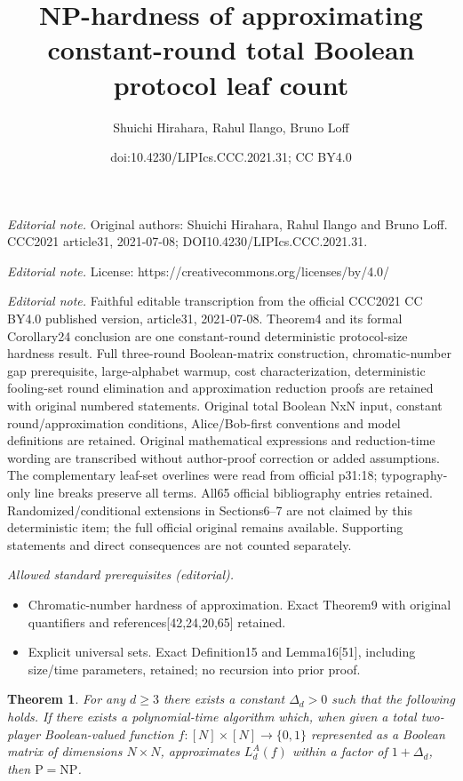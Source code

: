 \documentclass[10pt,a4paper]{article}
\title{NP-hardness of approximating constant-round total Boolean protocol leaf count}
\author{Shuichi Hirahara, Rahul Ilango, Bruno Loff}
\date{doi:10.4230/LIPIcs.CCC.2021.31; CC BY4.0}
\newtheorem{theorem}{Theorem}
\begin{document}
\maketitle
\noindent\textit{Editorial note.} Original authors: Shuichi Hirahara, Rahul Ilango and Bruno Loff. CCC2021 article31, 2021-07-08; DOI10.4230/LIPIcs.CCC.2021.31.\par\medskip
\noindent\textit{Editorial note.} License: https://creativecommons.org/licenses/by/4.0/\par\medskip
\noindent\textit{Editorial note.} Faithful editable transcription from the official CCC2021 CC BY4.0 published version, article31, 2021-07-08. Theorem4 and its formal Corollary24 conclusion are one constant-round deterministic protocol-size hardness result. Full three-round Boolean-matrix construction, chromatic-number gap prerequisite, large-alphabet warmup, cost characterization, deterministic fooling-set round elimination and approximation reduction proofs are retained with original numbered statements. Original total Boolean NxN input, constant round/approximation conditions, Alice/Bob-first conventions and model definitions are retained. Original mathematical expressions and reduction-time wording are transcribed without author-proof correction or added assumptions. The complementary leaf-set overlines were read from official p31:18; typography-only line breaks preserve all terms. All65 official bibliography entries retained. Randomized/conditional extensions in Sections6--7 are not claimed by this deterministic item; the full official original remains available. Supporting statements and direct consequences are not counted separately.\par\medskip
\noindent\textit{Allowed standard prerequisites (editorial).}\begin{itemize}
\item Chromatic-number hardness of approximation. Exact Theorem9 with original quantifiers and references[42,24,20,65] retained.
\item Explicit universal sets. Exact Definition15 and Lemma16[51], including size/time parameters, retained; no recursion into prior proof.
\end{itemize}\medskip
\setcounter{theorem}{3}
\begin{theorem}
For any $d\ge3$ there exists a constant $\Delta_d>0$ such that the following holds. If there exists a polynomial-time algorithm which, when given a total two-player Boolean-valued function $f:[N]\times[N]\to\{0,1\}$ represented as a Boolean matrix of dimensions $N\times N$, approximates $L_d^A(f)$ within a factor of $1+\Delta_d$, then $\mathrm P=\mathrm{NP}$.
\end{theorem}
\end{document}
